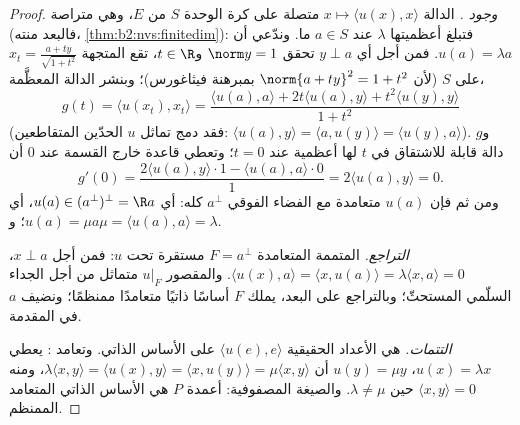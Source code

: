 \begin{proof}
\emph{وجود .} الدالة $x \mapsto \langle u(x),
x\rangle$ متصلة على كرة الوحدة $S$ من $E$، وهي
متراصة (فالبعد منته، \cref{thm:b2:nvs:finitedim}): فتبلغ
أعظميتها $\lambda$ عند $a \in S$ ما. وندّعي أن $u(a) = \lambda
a$. فمن أجل أي $y \perp a$ تحقق $\norm y = 1$ و$t \in \R$، تقع
المتجهة $x_t = \frac{a + ty}{\sqrt{1 + t^2}}$ على $S$
(لأن $\norm{a + ty}^2 = 1 + t^2$ بمبرهنة فيثاغورس)؛ وبنشر
الدالة المعظَّمة،
\[
g(t) = \langle u(x_t), x_t\rangle
= \frac{\langle u(a), a\rangle + 2t\langle u(a), y\rangle +
t^2\langle u(y), y\rangle}{1 + t^2}
\]
(فقد دمج تماثل $u$ الحدّين المتقاطعين: $\langle u(a),
y\rangle = \langle a, u(y)\rangle = \langle u(y), a\rangle$).
و$g$ دالة قابلة للاشتقاق في $t$ لها أعظمية عند $t =
0$؛ وتعطي قاعدة خارج القسمة عند $0$ أن
\[
g'(0) = \frac{2\langle u(a), y\rangle\cdot 1 - \langle u(a),
a\rangle\cdot 0}{1} = 2\langle u(a), y\rangle = 0 .
\]
ومن ثم فإن $u(a)$ متعامدة مع الفضاء الفوقي $a^\perp$ كله: أي $u(a)
\in (a^{\perp})^{\perp} = \R a$، أي $u(a) = \mu a$؛ و$\mu =
\langle u(a), a\rangle = \lambda$.

\emph{التراجع.} المتممة المتعامدة $F = a^\perp$
مستقرة تحت $u$: فمن أجل $x \perp a$، $\langle u(x), a\rangle = \langle x,
u(a)\rangle = \lambda\langle x, a\rangle = 0$. والمقصور
$u|_F$ متماثل من أجل الجداء السلّمي المستحثّ؛ وبالتراجع على
البعد، يملك $F$ أساسًا ذاتيًا متعامدًا ممنظمًا؛ ونضيف $a$ في المقدمة.

\emph{التتمات.}  هي الأعداد الحقيقية $\langle u(e),
e\rangle$ على الأساس الذاتي. وتعامد : يعطي $u(x) =
\lambda x$، $u(y) = \mu y$ أن $\lambda\langle x, y\rangle =
\langle u(x), y\rangle = \langle x, u(y)\rangle = \mu\langle x,
y\rangle$، ومنه $\langle x, y\rangle = 0$ حين $\lambda \neq \mu$.
والصيغة المصفوفية: أعمدة $P$ هي الأساس الذاتي المتعامد الممنظم.
\end{proof}

